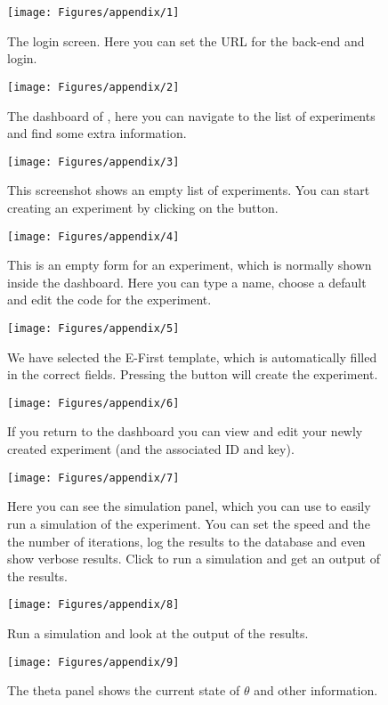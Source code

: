 \documentclass[nojss]{jss}
\begin{document}
\begin{figure}[H]
  \centering
  \texttt{[image: Figures/appendix/1]}
  \caption{The login screen. Here you can set the URL for the back-end and login.}
  \label{A1}
\end{figure}

\begin{figure}[H]
  \centering
    \texttt{[image: Figures/appendix/2]}
    \caption{The dashboard of , here you can navigate to the list of experiments and find some extra information.}
    \label{A2}
\end{figure}

\begin{figure}[H]
  \centering
    \texttt{[image: Figures/appendix/3]}
     \caption{This screenshot shows an empty list of experiments. You can start creating an experiment by clicking on the  button.}
    \label{A3}
\end{figure}
\begin{figure}[H]
  \centering
    \texttt{[image: Figures/appendix/4]}
     \caption{This is an empty form for an experiment, which is normally shown inside the dashboard. Here you can type a name, choose a default and edit the code for the experiment.}
    \label{A4}
\end{figure}
\begin{figure}[H]
  \centering
    \texttt{[image: Figures/appendix/5]}
     \caption{We have selected the E-First template, which is automatically filled in the correct fields. Pressing the  button will create the experiment.}
    \label{A5}
\end{figure}
\begin{figure}[H]
  \centering
    \texttt{[image: Figures/appendix/6]}
     \caption{If you return to the dashboard you can view and edit your newly created experiment (and the associated ID and key).}
    \label{A6}
\end{figure}
\begin{figure}[H]
  \centering
    \texttt{[image: Figures/appendix/7]}
     \caption{Here you can see the simulation panel, which you can use to easily run a simulation of the experiment. You can set the speed and the the number of iterations, log the results to the database and even show verbose results. Click  to run a simulation and get an output of the results.}
    \label{A7}
\end{figure}
\begin{figure}[H]
  \centering
    \texttt{[image: Figures/appendix/8]}
     \caption{Run a simulation and look at the output of the results.}
    \label{A8}
\end{figure}
\begin{figure}[H]
  \centering
    \texttt{[image: Figures/appendix/9]}
     \caption{The theta panel shows the current state of $\theta$ and other information.}
    \label{A9}
\end{figure}
\end{document}
